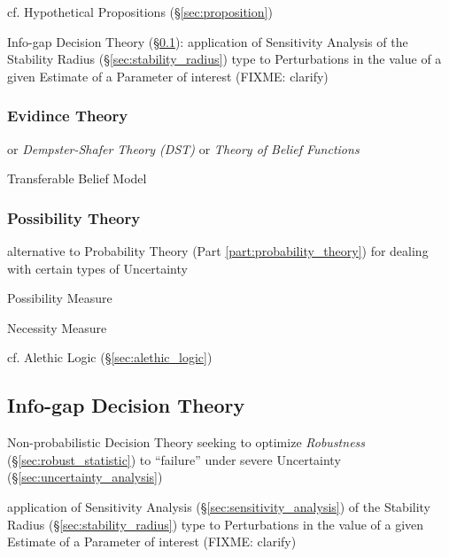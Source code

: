 cf. Hypothetical Propositions (\S\ref{sec:proposition})

\fist Info-gap Decision Theory (\S\ref{sec:info_gap}): application of
Sensitivity Analysis of the Stability Radius (\S\ref{sec:stability_radius}) type
to Perturbations in the value of a given Estimate of a Parameter of interest
(FIXME: clarify)



\subsubsection{Evidince Theory}\label{sec:evidence_theory}

or \emph{Dempster-Shafer Theory (DST)} or \emph{Theory of Belief Functions}

Transferable Belief Model



\subsubsection{Possibility Theory}\label{sec:possibility_theory}

alternative to Probability Theory (Part \ref{part:probability_theory}) for
dealing with certain types of Uncertainty

Possibility Measure

Necessity Measure

cf. Alethic Logic (\S\ref{sec:alethic_logic})



\subsection{Info-gap Decision Theory}\label{sec:info_gap}

Non-probabilistic Decision Theory seeking to optimize \emph{Robustness}
(\S\ref{sec:robust_statistic}) to ``failure'' under severe Uncertainty
(\S\ref{sec:uncertainty_analysis})

application of Sensitivity Analysis (\S\ref{sec:sensitivity_analysis}) of the
Stability Radius (\S\ref{sec:stability_radius}) type to Perturbations in the
value of a given Estimate of a Parameter of interest (FIXME: clarify)



